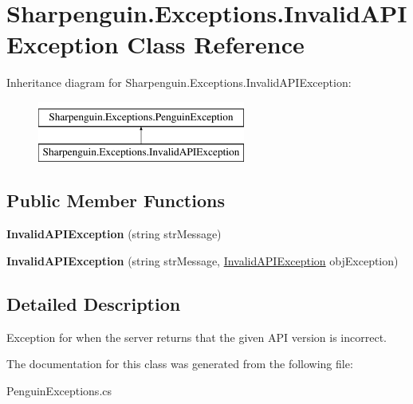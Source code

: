 \hypertarget{classSharpenguin_1_1Exceptions_1_1InvalidAPIException}{\section{\-Sharpenguin.\-Exceptions.\-Invalid\-A\-P\-I\-Exception \-Class \-Reference}
\label{classSharpenguin_1_1Exceptions_1_1InvalidAPIException}
}
\-Inheritance diagram for \-Sharpenguin.\-Exceptions.\-Invalid\-A\-P\-I\-Exception\-:\begin{figure}[H]
\begin{center}
\leavevmode
\includegraphics[height=2.000000cm]{classSharpenguin_1_1Exceptions_1_1InvalidAPIException}
\end{center}
\end{figure}
\subsection*{\-Public \-Member \-Functions}
\begin{DoxyCompactItemize}
\item 
\hypertarget{classSharpenguin_1_1Exceptions_1_1InvalidAPIException_a9f21411ded099d6ae5911a909bdec7c0}{{\bfseries \-Invalid\-A\-P\-I\-Exception} (string str\-Message)}\label{classSharpenguin_1_1Exceptions_1_1InvalidAPIException_a9f21411ded099d6ae5911a909bdec7c0}

\item 
\hypertarget{classSharpenguin_1_1Exceptions_1_1InvalidAPIException_a8e7238721e0246b07b37c6fef5a83de0}{{\bfseries \-Invalid\-A\-P\-I\-Exception} (string str\-Message, \hyperlink{classSharpenguin_1_1Exceptions_1_1InvalidAPIException}{\-Invalid\-A\-P\-I\-Exception} obj\-Exception)}\label{classSharpenguin_1_1Exceptions_1_1InvalidAPIException_a8e7238721e0246b07b37c6fef5a83de0}

\end{DoxyCompactItemize}


\subsection{\-Detailed \-Description}
\-Exception for when the server returns that the given \-A\-P\-I version is incorrect. 

\-The documentation for this class was generated from the following file\-:\begin{DoxyCompactItemize}
\item 
\-Penguin\-Exceptions.\-cs\end{DoxyCompactItemize}
